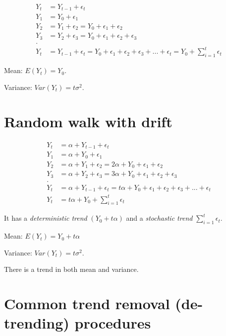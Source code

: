 \documentclass[
  11pt,
  a4paper,
]{report}
\begin{document}
\[
\begin{aligned}
  Y_t &= Y_{t-1} + \epsilon_t \\
     Y_1    &= Y_0 + \epsilon_1 \\
         Y_2 &=  Y_1 + \epsilon_2=Y_0 + \epsilon_1 + \epsilon_2\\
          Y_3 &=  Y_2 + \epsilon_3=Y_0 + \epsilon_1 + \epsilon_2 +\epsilon_3\\
          .   \\
          Y_t &=Y_{t-1} + \epsilon_t=Y_0 + \epsilon_1 + \epsilon_2 + \epsilon_3 +...+ \epsilon_t = Y_0 + \sum_{i=1}^{t} \epsilon_t
\end{aligned}
\]

Mean: \(E(Y_t) = Y_0\).

Variance: \(Var(Y_t)=t \sigma^2\).

\section{Random walk with drift}\label{random-walk-with-drift}

\[
\begin{aligned}
  Y_t &= \alpha + Y_{t-1} + \epsilon_t \\
     Y_1    &= \alpha+Y_0 + \epsilon_1 \\
         Y_2 &= \alpha+ Y_1 + \epsilon_2=2 \alpha+Y_0 + \epsilon_1 + \epsilon_2\\
          Y_3 &= \alpha+ Y_2 + \epsilon_3= 3 \alpha+ Y_0 + \epsilon_1 + \epsilon_2 +\epsilon_3\\
          .   \\
          Y_t &= \alpha+Y_{t-1} + \epsilon_t= t \alpha+ Y_0 + \epsilon_1 + \epsilon_2 + \epsilon_3 +...+ \epsilon_t \\
          Y_t &= t \alpha + Y_0 + \sum_{i=1}^{t} \epsilon_t
\end{aligned}
\]

It has a \emph{deterministic trend} \((Y_0 + t \alpha)\) and a
\emph{stochastic trend} \(\sum_{i=1}^{t} \epsilon_t\).

Mean: \(E(Y_t) = Y_0 + t\alpha\)

Variance: \(Var(Y_t) = t\sigma^2\).

There is a trend in both mean and variance.

\section{Common trend removal (de-trending)
procedures}\label{common-trend-removal-de-trending-procedures}
\end{document}
